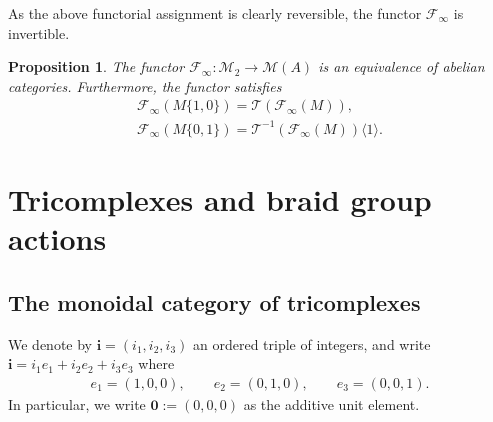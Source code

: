 \documentclass[10pt,a4paper]{amsart}
\newtheorem{prop}[thm]{Proposition}
\theoremstyle{definition}
\numberwithin{equation}{section}
\def\lra{{\longrightarrow}}
\def\mc{\mathcal}
\begin{document}
As the above functorial assignment is clearly reversible, the functor $\mc{F}_\infty$ is invertible.

\begin{prop}\label{prop-abelian-equivalence}
The functor $\mc{F}_\infty\colon \mc{M}_2\lra \mc{M}(A)$ is an equivalence of abelian categories. Furthermore, the functor satisfies
 \begin{gather*}\mc{F}_\infty (M\{1,0\})= \mc{T}(\mc{F}_\infty(M)), \\
 \mc{F}_\infty(M\{0,1\})=\mc{T}^{-1}(\mc{F}_{\infty}(M))\langle 1 \rangle
 .\end{gather*}
\end{prop}

\section{Tricomplexes and braid group actions} \label{sectricomplex}
\subsection{The monoidal category of tricomplexes}
We denote by $\mathbf{i} = (i_1,i_2,i_3)$ an ordered triple of integers, and write
$\mathbf{i}=i_1 e_1 + i_2 e_2 + i_3 e_3$ where
\begin{gather*} e_1=(1,0,0), \qquad e_2=(0,1,0),\qquad e_3=(0,0,1).\end{gather*}
In particular, we write $\mathbf{0}:=(0,0,0)$ as the additive unit element.
\end{document}
